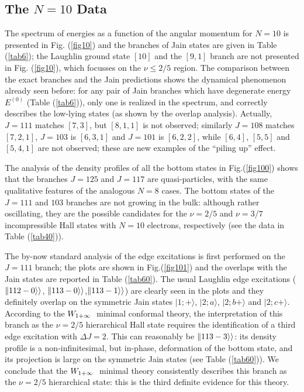 
\subsection{\bf The $N=10$ Data}

The spectrum of energies as a function
of the angular momentum for $N=10$ is presented in Fig. (\ref{fig10})
and the branches of Jain states are given in Table (\ref{tab6});
the Laughlin ground state $[10]$ and the $[9,1]$ 
branch are not presented in Fig. (\ref{fig10}), which focusses
on the $\nu\le 2/5$ region. 
The comparison between the exact branches and the Jain predictions 
shows the dynamical phenomenon already seen before: 
for any pair of Jain branches which have degenerate energy
$E^{(0)}$ (Table (\ref{tab6})), only one is realized in the spectrum, 
and correctly describes the low-lying states
(as shown by the overlap analysis).
Actually, $J=111$ matches $[7,3]$, but $[8,1,1]$ is not observed;
similarly $J=108$ matches $[7,2,1]$, $J=103$ is $[6,3,1]$ and
$J=101$ is $[6,2,2]$, while $[6,4]$, $[5,5]$ and $[5,4,1]$ are not observed; 
these are new examples of the ``piling up'' effect.

The analysis of the density profiles of all the bottom
states in Fig.(\ref{fig100})
shows that the branches $J=125$ and $J=117$ are quasi-particles,
with the same qualitative features of the analogous $N=8$ cases.
The bottom states of the $J=111$ and $103$ branches
are not growing in the bulk: although rather oscillating, 
they are the possible candidates
for the $\nu=2/5$ and $\nu=3/7$ incompressible Hall states with $N=10$
electrons, respectively (see the data in Table (\ref{tab40})).

The by-now standard analysis of the edge excitations is first performed
on the $J=111$ branch; the plots are shown in Fig.(\ref{fig101})
and the overlaps with the Jain states are reported in Table (\ref{tab60}).
The usual Laughlin edge excitations ($\Vert 112-0 \rangle\rangle$,
$\Vert 113-0 \rangle\rangle$,$\Vert 113-1 \rangle\rangle$) are clearly seen in the plots
and they definitely overlap on the symmetric Jain states $\vert 1;+\rangle$,
$\vert 2;a\rangle$, $\vert 2;b+\rangle$ and $\vert 2;c+\rangle$. 
According to the $W_{1+\infty}\ $ minimal conformal theory, the interpretation 
of this branch as the $\nu=2/5$ hierarchical Hall state requires the
identification of a third edge excitation with $\Delta J=2$. 
This can reasonably be $\Vert 113-3\rangle\rangle$: its density profile is a
non-infinitesimal, but in-phase, deformation of the bottom state, and its
projection is large on the symmetric Jain states (see Table
(\ref{tab60})).
We conclude that the $W_{1+\infty}\ $ minimal theory consistently describes
this branch as the $\nu=2/5$ hierarchical state:
this is the third definite evidence for this theory. 

